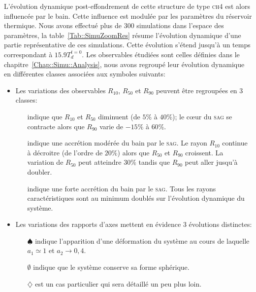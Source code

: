	L'évolution dynamique post-effondrement de cette structure de type \textsc{ch4} est alors influencée par le bain. Cette influence est modulée
	par les paramètres du réservoir thermique. Nous avons effectué plus de 300 simulations dans l'espace des paramètres, la
	table~\ref{Tab::SimuZoomRes} résume l'évolution dynamique d'une partie représentative de ces simulations. Cette évolution s'étend jusqu'à un
	temps correspondant à $15.9 T_d^{t=0}$.
	Les observables étudiées sont celles définies dans le chapitre~\ref{Chap::Simu::Analysis}, nous avons regroupé leur évolution dynamique en
	différentes classes associées aux symboles suivants:
	

	\begin{itemize}

		\item Les variations des observables $R_{10}$, $R_{50}$ et $R_{90}$ peuvent être regroupées en 3 classes:
			\begin{itemize}

				\item[\accretionpeu{}] indique que $R_{10}$ et $R_{50}$ diminuent (de $5\%$ à $40\%$); le cœur du \textsc{sag} se
					contracte alors que $R_{90}$ varie de $-15\%$ à $60\%$.

				\item[\accretionmoyen{}] indique une accrétion modérée du bain par le \textsc{sag}. Le rayon $R_{10}$ continue
					à décroitre (de l'ordre de $20\%$) alors que $R_{50}$ et $R_{90}$ croissent. La variation de $R_{50}$ peut
					atteindre $30\%$ tandis que $R_{90}$ peut aller jusqu'à doubler.

				\item[\accretionlot{}] indique une forte accrétion du bain par le \textsc{sag}. Tous les rayons caractéristiques sont
					au minimum doublés sur l'évolution dynamique du système.
			\end{itemize}

		\item Les variations des rapports d'axes mettent en évidence 3 évolutions distinctes:
			\begin{itemize}

				\item[$\spadesuit$] indique l'apparition d'une déformation du système au cours de laquelle $a_1 \simeq 1$ et $a_2 \to 0,4$.

				\item[$\emptyset$] indique que le système conserve sa forme sphérique.

				\item[$\diamondsuit$] est un cas particulier qui sera détaillé un peu plus loin.

			\end{itemize}
	\end{itemize}

